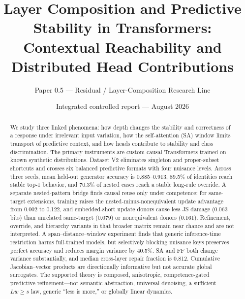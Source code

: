 \documentclass[10pt]{article}
\title{Layer Composition and Predictive Stability in Transformers:\\Contextual Reachability and Distributed Head Contributions}
\author{Paper 0.5 --- Residual / Layer-Composition Research Line}
\date{Integrated controlled report --- August 2026}
\begin{document}
\maketitle

\begin{abstract}
We study three linked phenomena: how depth changes the stability and correctness of a response under irrelevant input variation, how the self-attention (SA) window limits transport of predictive context, and how heads contribute to stability and class discrimination. The primary instruments are custom causal Transformers trained on known synthetic distributions. Dataset V2 eliminates singleton and proper-subset shortcuts and crosses six balanced predictive formats with four nuisance levels. Across three seeds, mean held-out generator accuracy is 0.885--0.913, 89.5\% of identities reach stable top-1 behavior, and 70.3\% of nested cases reach a stable long-rule override. A separate nested-pattern bridge finds causal reuse only under competence: for same-target extensions, training raises the nested-minus-nonequivalent update advantage from 0.002 to 0.122, and embedded-short update donors cause less JS damage (0.063 bits) than unrelated same-target (0.079) or nonequivalent donors (0.161). Refinement, override, and hierarchy variants in that broader matrix remain near chance and are not interpreted. A span--distance--window experiment finds that generic inference-time restriction harms full-trained models, but selectively blocking nuisance keys preserves perfect accuracy and reduces margin variance by 40.5\%. SA and FF both change variance substantially, and median cross-layer repair fraction is 0.812. Cumulative Jacobian--vector products are directionally informative but not accurate global surrogates. The supported theory is composed, anisotropic, competence-gated predictive refinement---not semantic abstraction, universal denoising, a sufficient $Lw\ge s$ law, generic ``less is more,'' or globally linear dynamics.
\end{abstract}
\end{document}
